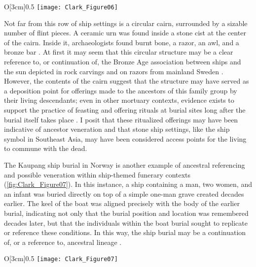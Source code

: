 \begin{wrapfigure}{O}[3cm]{0.5\textwidth}
	\texttt{[image: Clark\_Figure06]}
	\caption{Stone Ships at Rannarve, near Klintehamn, Gotland, Sweden. 2008.
		{\normalfont\scriptsize \\ \copyright\ BH2008, Wikimedia Commons License.
	}}
	\label{fig:Clark_Figure06}
\end{wrapfigure}

Not far from this row of ship settings is a circular cairn, surrounded by a sizable number of flint pieces. A ceramic urn was found inside a stone cist at the center of the cairn. Inside it, archaeologists found burnt bone, a razor, an awl, and a bronze bar \parencite[7--26]{Gustavsson_2012}.
At first it may seem that this circular structure may be a clear reference to, or continuation of, the Bronze Age association between ships and the sun depicted in rock carvings and on razors from mainland Sweden \parencites{Kaul_1998}[400]{Skoglund_2008}.
However, the contents of the cairn suggest that the structure may have served as a deposition point for offerings made to the ancestors of this family group by their living descendants; even in other mortuary contexts, evidence exists to support the practice of feasting and offering rituals at burial sites long after the burial itself takes place \parencite[261]{Price_2008}. I posit that these ritualized offerings may have been indicative of ancestor veneration and that stone ship settings, like the ship symbol in Southeast Asia, may have been considered access points for the living to commune with the dead.

The Kaupang ship burial in Norway is another example of ancestral referencing and possible veneration within ship-themed funerary contexts (\cref{fig:Clark_Figure07}).
In this instance, a ship containing a man, two women, and an infant was buried directly on top of a simple one-man grave created decades earlier. The keel of the boat was aligned precisely with the body of the earlier burial, indicating not only that the burial position and location was remembered decades later, but that the individuals within the boat burial sought to replicate or reference these conditions. In this way, the ship burial may be a continuation of, or a reference to, ancestral lineage \parencites[267--268]{Price_2008}{Price_2012b}.

\begin{wrapfigure}{O}[3cm]{0.5\textwidth}
	\texttt{[image: Clark\_Figure07]}
	\caption{A boat burial from Kaupang, Norway, early 10th century. Image by Þórhallur Þráinsson.
		{\normalfont\scriptsize \\ \copyright\ Neil Price, used with permission.
	}}
	\label{fig:Clark_Figure07}
\end{wrapfigure}

